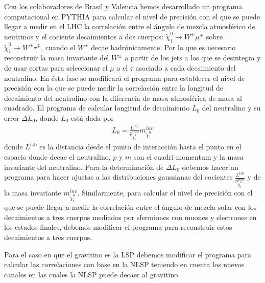\begin{itemize}
\begin{proyecto}
  Con los colaboradores de Brasil y Valencia hemos desarrollado un
  programa computacional en PYTHIA para calcular el nivel de precisión
  con el que se puede llegar a medir en el LHC la correlación entre el
  ángulo de mezcla atmosférico de neutrinos y el cociente decaimientos
  a dos cuerpos: $\tilde\chi_1^0\to W^\pm\mu^\mp$ sobre
  $\tilde\chi_1^0\to W^\pm\tau^\mp$, cuando el $W^\pm$ decae
  hadrónicamente. Por lo que es necesario reconstruir la masa
  invariante del $W^\pm$ a partir de los jets a los que se desintegra
  y de usar cortas para seleccionar el $\mu$ o el $\tau$ asociado a
  cada decaimiento del neutralino. En ésta fase se modificará el
  programa para establecer el nivel de precisión con la que se puede
  medir la correlación entre la longitud de decaimiento del neutralino
  con la diferencia de masa atmosférica de masa al cuadrado.  El
  programa de calcular longitud de decaimiento $L_0$ del neutralino y
  su error $\Delta L_0$, donde $L_0$ está dada por
  \begin{align}
    L_0=\frac{L^{\text{lab}}}{p_{\tilde\chi_1^0}^{\text{reco}}}m_{\tilde\chi_1^0}^{inv}
  \end{align}
  donde $L^{\text{lab}}$ es la distancia desde el punto de interacción
  hasta el punto en el espacio donde decae el neutralino, $p$ y $m$
  son el cuadri-momentum y la masa invariante del neutralino. Para la
  determinación de $\Delta L_0$ debemos hacer un programa para hacer
  ajustas a las distribuciones gaussianas del cocientes
  $\frac{L^{\text{lab}}}{p_{\tilde\chi_1^0}^{\text{reco}}}$ y de la
  masa invariante $m_{\tilde\chi_1^0}^{inv}$. Similarmente, para calcular el nivel de precisión
  con el que se puede llegar a medir la correlación entre el ángulo de mezcla solar con 
  los decaimientos a tres cuerpos mediados por sfermiones con muones y
  electrones en los estados finales, debemos modificar el programa
  para reconstruir estos decaimientos a tres cuerpos. 
\end{proyecto}

\begin{proyecto}
  Para el caso en que el gravitino es la LSP debemos modificar el programa para calcular las correlaciones con base en la NLSP teniendo en cuenta los nuevos canales en las cuales la NLSP puede decaer al gravitino 
\end{proyecto}



\end{itemize}
